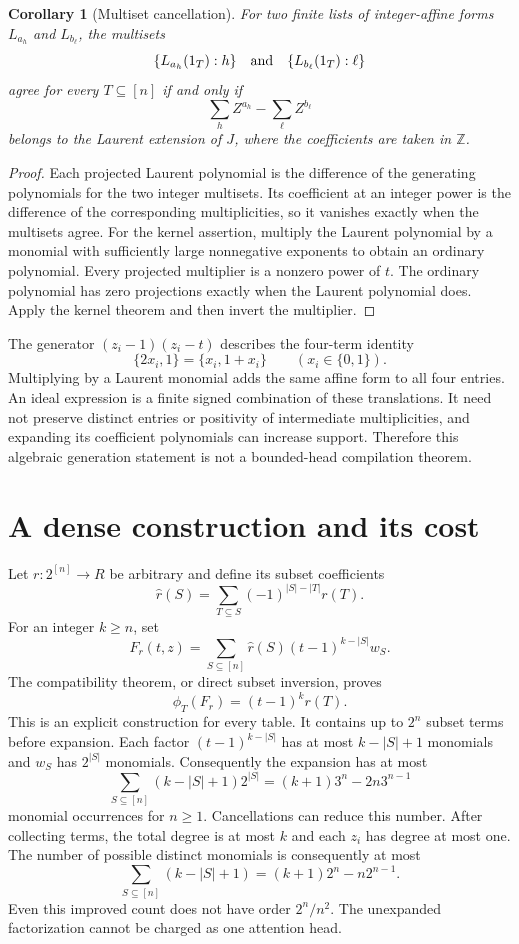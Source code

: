 \documentclass[11pt]{article}
\newtheorem{corollary}[theorem]{Corollary}
\begin{document}
\begin{corollary}[Multiset cancellation]
For two finite lists of integer-affine forms $L_{a_h}$ and
$L_{b_\ell}$, the multisets
\[
 \{L_{a_h}(1_T):h\}\quad\hbox{and}\quad
 \{L_{b_\ell}(1_T):\ell\}
\]
agree for every $T\subseteq[n]$ if and only if
\[
 \sum_h Z^{a_h}-\sum_\ell Z^{b_\ell}
\]
belongs to the Laurent extension of $J$, where the coefficients
are taken in $\mathbb Z$.
\end{corollary}
\begin{proof}
Each projected Laurent polynomial is the difference of the generating
polynomials for the two integer multisets. Its coefficient at an
integer power is the difference of the corresponding multiplicities,
so it vanishes exactly when the multisets agree.
For the kernel assertion, multiply the Laurent polynomial by a
monomial with sufficiently large nonnegative exponents to obtain an
ordinary polynomial. Every projected multiplier is a nonzero power
of $t$. The ordinary polynomial has zero projections exactly when
the Laurent polynomial does. Apply the kernel theorem and then
invert the multiplier.
\end{proof}

The generator $(z_i-1)(z_i-t)$ describes the four-term identity
\[
 \{2x_i,1\}=\{x_i,1+x_i\}
 \qquad(x_i\in\{0,1\}).
\]
Multiplying by a Laurent monomial adds the same affine form to
all four entries. An ideal expression is a finite signed combination
of these translations. It need not preserve distinct entries or
positivity of intermediate multiplicities, and expanding its
coefficient polynomials can increase support. Therefore this algebraic
generation statement is not a bounded-head compilation theorem.

\section{A dense construction and its cost}

Let $r:2^{[n]}\to R$ be arbitrary and define its subset coefficients
\[
 \widehat r(S)=\sum_{T\subseteq S}(-1)^{|S|-|T|}r(T).
\]
For an integer $k\geq n$, set
\[
 F_r(t,z)=\sum_{S\subseteq[n]}\widehat r(S)
       (t-1)^{k-|S|}w_S.
\]
The compatibility theorem, or direct subset inversion, proves
\[
 \phi_T(F_r)=(t-1)^k r(T).
\]
This is an explicit construction for every table. It contains up to
$2^n$ subset terms before expansion. Each factor $(t-1)^{k-|S|}$
has at most $k-|S|+1$ monomials and $w_S$ has $2^{|S|}$ monomials.
Consequently the expansion has at most
\[
 \sum_{S\subseteq[n]}(k-|S|+1)2^{|S|}
  =(k+1)3^n-2n3^{n-1}
\]
monomial occurrences for $n\geq1$. Cancellations can reduce this
number. After collecting terms, the total degree is at most $k$
and each $z_i$ has degree at most one. The number of possible
distinct monomials is consequently at most
\[
 \sum_{S\subseteq[n]}(k-|S|+1)
       =(k+1)2^n-n2^{n-1}.
\]
Even this improved count does not have order $2^n/n^2$. The
unexpanded factorization cannot be charged as one attention head.
\end{document}
